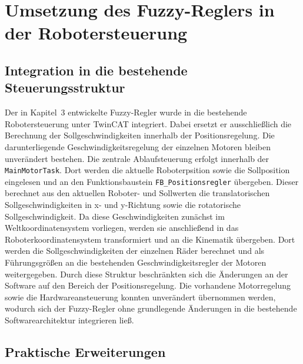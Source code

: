 \section{Umsetzung des Fuzzy-Reglers in der Robotersteuerung}

\subsection{Integration in die bestehende Steuerungsstruktur}

Der in Kapitel~3 entwickelte Fuzzy-Regler wurde in die bestehende Robotersteuerung unter TwinCAT integriert. Dabei ersetzt er ausschließlich die Berechnung der Sollgeschwindigkeiten innerhalb der Positionsregelung. Die darunterliegende Geschwindigkeitsregelung der einzelnen Motoren bleiben unverändert bestehen. Die zentrale Ablaufsteuerung erfolgt innerhalb der \texttt{MainMotorTask}. Dort werden die aktuelle Roboterpsition sowie die Sollposition eingelesen und an den Funktionsbaustein \texttt{FB\_Positionsregler} übergeben. Dieser berechnet aus den aktuellen Roboter- und Sollwerten die translatorischen Sollgeschwindigkeiten in x- und y-Richtung sowie die rotatorische Sollgeschwindigkeit. Da diese Geschwindigkeiten zunächst im Weltkoordinatensystem vorliegen, werden sie anschließend in das Roboterkoordinatensystem transformiert und an die Kinematik übergeben. Dort werden die Sollgeschwindigkeiten der einzelnen Räder berechnet und als Führungsgrößen an die bestehenden Geschwindigkeitsregler der Motoren weitergegeben. Durch diese Struktur beschränkten sich die Änderungen an der Software auf den Bereich der Positionsregelung. Die vorhandene Motorregelung sowie die Hardwareansteuerung konnten unverändert übernommen werden, wodurch sich der Fuzzy-Regler ohne grundlegende Änderungen in die bestehende Softwarearchitektur integrieren ließ.

\subsection{Praktische Erweiterungen}

